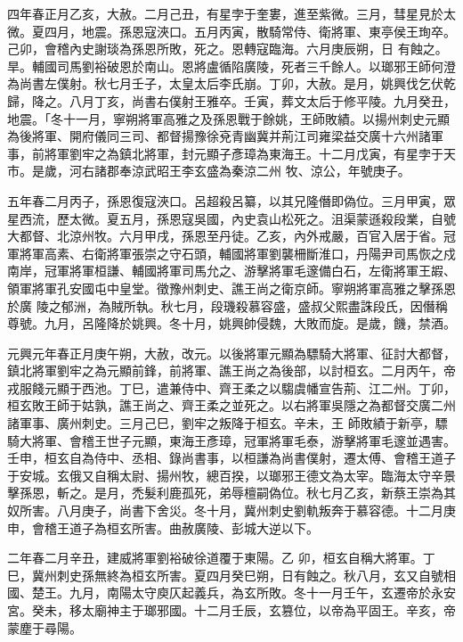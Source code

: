 \begin{pinyinscope}
 四年春正月乙亥，大赦。二月己丑，有星孛于奎婁，進至紫微。三月，彗星見於太微。夏四月，地震。孫恩寇浹口。五月丙寅，散騎常侍、衛將軍、東亭侯王珣卒。己卯，會稽內史謝琰為孫恩所敗，死之。恩轉寇臨海。六月庚辰朔，日
 有蝕之。旱。輔國司馬劉裕破恩於南山。恩將盧循陷廣陵，死者三千餘人。以瑯邪王師何澄為尚書左僕射。秋七月壬子，太皇太后李氏崩。丁卯，大赦。是月，姚興伐乞伏乾歸，降之。八月丁亥，尚書右僕射王雅卒。壬寅，葬文太后于修平陵。九月癸丑，地震。「冬十一月，寧朔將軍高雅之及孫恩戰于餘姚，王師敗績。以揚州刺史元顯為後將軍、開府儀同三司、都督揚豫徐兗青幽冀并荊江司雍梁益交廣十六州諸軍事，前將軍劉牢之為鎮北將軍，封元顯子彥璋為東海王。十二月戊寅，有星孛于天市。是歲，河右諸郡奉涼武昭王李玄盛為秦涼二州
 牧、涼公，年號庚子。



 五年春二月丙子，孫恩復寇浹口。呂超殺呂纂，以其兄隆僭即偽位。三月甲寅，眾星西流，歷太微。夏五月，孫恩寇吳國，內史袁山松死之。沮渠蒙遜殺段業，自號大都督、北涼州牧。六月甲戌，孫恩至丹徒。乙亥，內外戒嚴，百官入居于省。冠軍將軍高素、右衛將軍張崇之守石頭，輔國將軍劉襲柵斷淮口，丹陽尹司馬恢之戍南岸，冠軍將軍桓謙、輔國將軍司馬允之、游擊將軍毛邃備白石，左衛將軍王嘏、領軍將軍孔安國屯中皇堂。徵豫州刺史、譙王尚之衛京師。寧朔將軍高雅之擊孫恩於廣
 陵之郁洲，為賊所執。秋七月，段璣殺慕容盛，盛叔父熙盡誅段氏，因僭稱尊號。九月，呂隆降於姚興。冬十月，姚興帥侵魏，大敗而旋。是歲，饑，禁酒。



 元興元年春正月庚午朔，大赦，改元。以後將軍元顯為驃騎大將軍、征討大都督，鎮北將軍劉牢之為元顯前鋒，前將軍、譙王尚之為後部，以討桓玄。二月丙午，帝戎服餞元顯于西池。丁巳，遣兼侍中、齊王柔之以騶虞幡宣告荊、江二州。丁卯，桓玄敗王師于姑孰，譙王尚之、齊王柔之並死之。以右將軍吳隱之為都督交廣二州諸軍事、廣州刺史。三月己巳，劉牢之叛降于桓玄。辛未，王
 師敗績于新亭，驃騎大將軍、會稽王世子元顯，東海王彥璋，冠軍將軍毛泰，游擊將軍毛邃並遇害。壬申，桓玄自為侍中、丞相、錄尚書事，以桓謙為尚書僕射，遷太傅、會稽王道子于安城。玄俄又自稱太尉、揚州牧，總百揆，以瑯邪王德文為太宰。臨海太守辛景擊孫恩，斬之。是月，禿髮利鹿孤死，弟辱檀嗣偽位。秋七月乙亥，新蔡王崇為其奴所害。八月庚子，尚書下舍災。冬十月，冀州刺史劉軌叛奔于慕容德。十二月庚申，會稽王道子為桓玄所害。曲赦廣陵、彭城大逆以下。



 二年春二月辛丑，建威將軍劉裕破徐道覆于東陽。乙
 卯，桓玄自稱大將軍。丁巳，冀州刺史孫無終為桓玄所害。夏四月癸巳朔，日有蝕之。秋八月，玄又自號相國、楚王。九月，南陽太守庾仄起義兵，為玄所敗。冬十一月壬午，玄遷帝於永安宮。癸未，移太廟神主于瑯邪國。十二月壬辰，玄篡位，以帝為平固王。辛亥，帝蒙塵于尋陽。




\end{pinyinscope}
